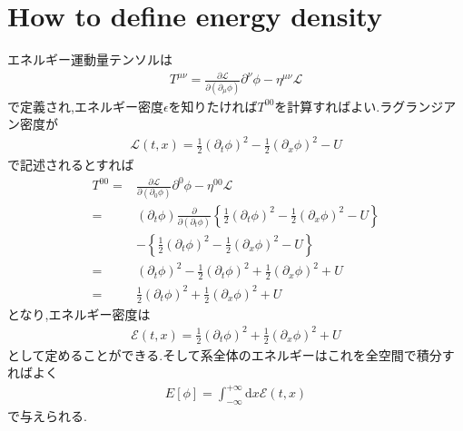 \documentclass[dvipdfmx,11pt,a4paper,oneside,openany]{jsbook}
\begin{document}
\chapter{How to define energy density}
エネルギー運動量テンソルは
\begin{align*}
    T^{\mu \nu}=\frac{\partial \mathcal{L}}{\partial\left(\partial_{\mu} \phi\right)} \partial^{\nu} \phi-\eta^{\mu \nu} \mathcal{L}
\end{align*}
で定義され,エネルギー密度$\epsilon$を知りたければ$T^{00}$を計算すればよい.ラグランジアン密度が
\begin{align*}
    \mathcal{L}(t,x)=\frac{1}{2}\left(\partial_{t} \phi\right)^{2}-\frac{1}{2}\left(\partial_{x} \phi\right)^{2}-U
\end{align*}
で記述されるとすれば
\begin{align*}
    T^{00}= & \frac{\partial \mathcal{L}}{\partial\left(\partial_{0} \phi\right)} \partial^{0} \phi-\eta^{00} \mathcal{L}                                                                                        \\
    =       & \left(\partial_{t} \phi\right) \frac{\partial}{\partial\left(\partial_{t} \phi\right)}\left\{\frac{1}{2}\left(\partial_{t} \phi\right)^{2}-\frac{1}{2}\left(\partial_{x} \phi\right)^{2}-U\right\} \\
            & -\left\{\frac{1}{2}\left(\partial_{t} \phi\right)^{2}-\frac{1}{2}\left(\partial_{x} \phi\right)^{2}-U\right\}                                                                                      \\
    =       & \left(\partial_{t} \phi\right)^{2}-\frac{1}{2}\left(\partial_{t} \phi\right)^{2}+\frac{1}{2}\left(\partial_{x} \phi\right)^{2}+U                                                                   \\
    =       & \frac{1}{2}\left(\partial_{t} \phi\right)^{2}+\frac{1}{2}\left(\partial_{x} \phi\right)^{2}+U
\end{align*}
となり,エネルギー密度は
\begin{align*}
    \mathcal{E}(t, x)=\frac{1}{2}\left(\partial_{t} \phi\right)^{2}+\frac{1}{2}\left(\partial_{x} \phi\right)^{2}+U
\end{align*}
として定めることができる.そして系全体のエネルギーはこれを全空間で積分すればよく
\begin{align*}
    E[\phi]=\int_{-\infty}^{+\infty} \mathrm{d} x \mathcal{E}(t, x)
\end{align*}
で与えられる.
\end{document}
